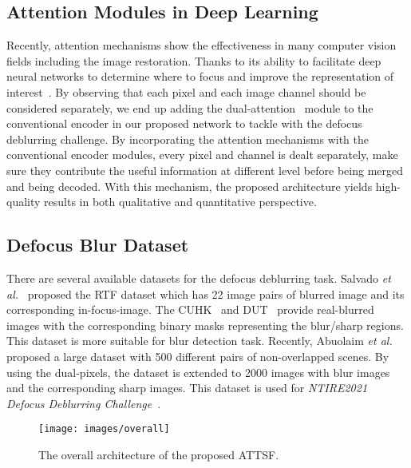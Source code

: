 \documentclass[final]{cvpr}
\begin{document}
\subsection{Attention Modules in Deep Learning}

Recently, attention mechanisms show the effectiveness in many computer vision fields including the image restoration. Thanks to its ability to facilitate deep neural networks to determine where to focus and improve the representation of interest~\cite{an}. By observing that each pixel and each image channel should be considered separately, we end up adding the dual-attention~\cite{dual} module to the conventional encoder in our proposed network to tackle with the defocus deblurring challenge. 
By incorporating the attention mechanisms with the conventional encoder modules, every pixel and channel is dealt separately, make sure they contribute the useful information at different level before being merged and being decoded. With this mechanism, the proposed architecture yields high-quality results in both qualitative and quantitative perspective.

\subsection{Defocus Blur Dataset}

There are several available datasets for the defocus deblurring task. Salvado \textit{et al.}~\cite{salvado} proposed the RTF dataset which has 22 image pairs of blurred image and its corresponding in-focus-image. The CUHK~\cite{shi} and DUT~\cite{zhao} provide real-blurred images with the corresponding binary masks representing the blur/sharp regions. This dataset is more suitable for blur detection task. Recently, Abuolaim \textit{et al.}~\cite{abuolaim2020defocus}  proposed a large dataset with 500 different pairs of non-overlapped scenes. By using the dual-pixels, the dataset is extended to 2000 images with blur images and the corresponding sharp images. This dataset is used for \textit{NTIRE2021 Defocus Deblurring Challenge~\cite{ntire}}.

\begin{figure*}
\begin{center}
\texttt{[image: images/overall]}
\end{center}
   \caption{The overall architecture of the proposed ATTSF.}
\label{fig:overall}
\end{figure*}
\end{document}

